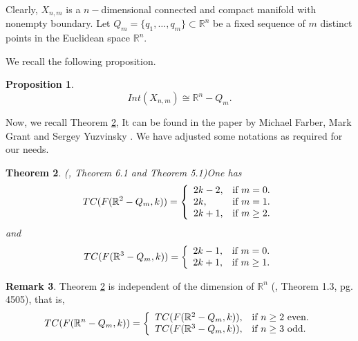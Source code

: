 \documentclass{amsart}
\newtheorem{thm}{Theorem}[section]
\newtheorem{prop}[thm]{Proposition}
\theoremstyle{definition}
\newtheorem{rem}[thm]{Remark}
\numberwithin{equation}{section}
\begin{document}
Clearly, $X_{n,m}$ is a $n-$dimensional connected and compact manifold with nonempty boundary. Let $Q_m=\{q_1,\ldots,q_m\}\subset \mathbb{R}^n$ be a fixed sequence of $m$ distinct points in the Euclidean space $\mathbb{R}^n$. 

We recall the following proposition.
\begin{prop}\label{p-1}
\begin{equation}Int(X_{n,m})\cong \mathbb{R}^n-Q_m.\end{equation}
\end{prop}

Now, we recall Theorem \ref{F-G-Y},  It can be found in the paper by Michael Farber, Mark Grant and Sergey Yuzvinsky \cite{farber2007topological}. We have adjusted some notations as required for our needs. 

\begin{thm}(\cite{farber2007topological}, Theorem 6.1 and Theorem 5.1)\label{F-G-Y} One has
\begin{equation} TC(F(\mathbb{R}^2-Q_m,k))=\left\{
              \begin{array}{ll}
                2k-2, & \hbox{if $m=0$.} \\
                2k, & \hbox{if $m=1$.}\\
                2k+1, & \hbox{if $m\geq 2$.}
              \end{array}
            \right.\end{equation}
 and \begin{equation} TC(F(\mathbb{R}^3-Q_m,k))=\left\{
              \begin{array}{ll}
                2k-1, & \hbox{if $m=0$.} \\
                2k+1, & \hbox{if $m\geq 1$.}
              \end{array}
            \right.\end{equation}
\end{thm}

\begin{rem}
Theorem \ref{F-G-Y} is independent of the dimension of $\mathbb{R}^n$ (\cite{gonzalez2015sequential}, Theorem 1.3, pg. 4505), that is, 
\begin{equation}
TC(F(\mathbb{R}^n-Q_m,k))=\left\{
              \begin{array}{ll}
               TC(F(\mathbb{R}^2-Q_m,k)), & \hbox{if $n\geq 2$ even.} \\
            TC(F(\mathbb{R}^3-Q_m,k)), & \hbox{if $n\geq 3$ odd.}
              \end{array}
            \right.
\end{equation} 
\end{rem}
\end{document}
